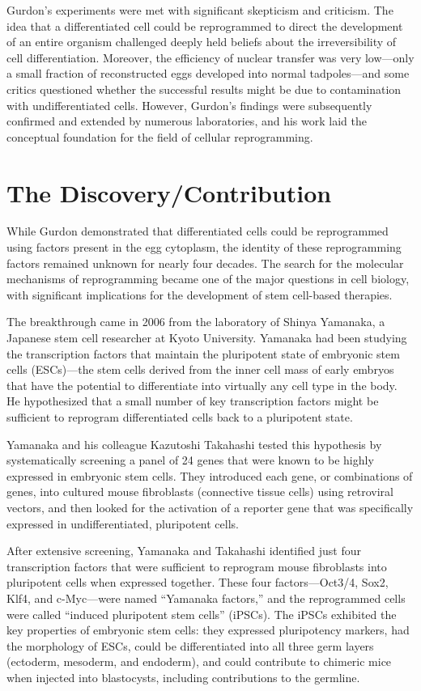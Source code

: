 Gurdon's experiments were met with significant skepticism and criticism. The idea that a differentiated cell could be reprogrammed to direct the development of an entire organism challenged deeply held beliefs about the irreversibility of cell differentiation. Moreover, the efficiency of nuclear transfer was very low---only a small fraction of reconstructed eggs developed into normal tadpoles---and some critics questioned whether the successful results might be due to contamination with undifferentiated cells. However, Gurdon's findings were subsequently confirmed and extended by numerous laboratories, and his work laid the conceptual foundation for the field of cellular reprogramming.

\section{The Discovery/Contribution}

While Gurdon demonstrated that differentiated cells could be reprogrammed using factors present in the egg cytoplasm, the identity of these reprogramming factors remained unknown for nearly four decades. The search for the molecular mechanisms of reprogramming became one of the major questions in cell biology, with significant implications for the development of stem cell-based therapies.

The breakthrough came in 2006 from the laboratory of Shinya Yamanaka, a Japanese stem cell researcher at Kyoto University. Yamanaka had been studying the transcription factors that maintain the pluripotent state of embryonic stem cells (ESCs)---the stem cells derived from the inner cell mass of early embryos that have the potential to differentiate into virtually any cell type in the body. He hypothesized that a small number of key transcription factors might be sufficient to reprogram differentiated cells back to a pluripotent state.

Yamanaka and his colleague Kazutoshi Takahashi tested this hypothesis by systematically screening a panel of 24 genes that were known to be highly expressed in embryonic stem cells. They introduced each gene, or combinations of genes, into cultured mouse fibroblasts (connective tissue cells) using retroviral vectors, and then looked for the activation of a reporter gene that was specifically expressed in undifferentiated, pluripotent cells.

After extensive screening, Yamanaka and Takahashi identified just four transcription factors that were sufficient to reprogram mouse fibroblasts into pluripotent cells when expressed together. These four factors---Oct3/4, Sox2, Klf4, and c-Myc---were named ``Yamanaka factors,'' and the reprogrammed cells were called ``induced pluripotent stem cells'' (iPSCs). The iPSCs exhibited the key properties of embryonic stem cells: they expressed pluripotency markers, had the morphology of ESCs, could be differentiated into all three germ layers (ectoderm, mesoderm, and endoderm), and could contribute to chimeric mice when injected into blastocysts, including contributions to the germline.

